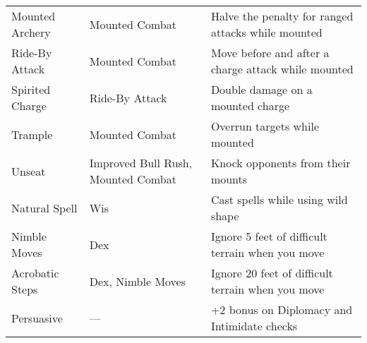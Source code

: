 \begin{table*}
\begin{tabularx}{\linewidth}{lXl}
\quad Mounted Archery & Mounted Combat & Halve the penalty for ranged attacks while mounted\\
\quad Ride-By Attack & Mounted Combat & Move before and after a charge attack while mounted\\
\quad \quad Spirited Charge & Ride-By Attack & Double damage on a mounted charge\\
\quad Trample & Mounted Combat & Overrun targets while mounted\\
\quad Unseat & Improved Bull Rush, Mounted Combat & Knock opponents from their mounts\\
Natural Spell & Wis & Cast spells while using wild shape\\
Nimble Moves & Dex & Ignore 5 feet of difficult terrain when you move\\
\quad Acrobatic Steps & Dex, Nimble Moves & Ignore 20 feet of difficult terrain when you move\\
Persuasive & --- &  +2 bonus on Diplomacy and Intimidate checks\\
\end{tabularx}
\end{table*}
